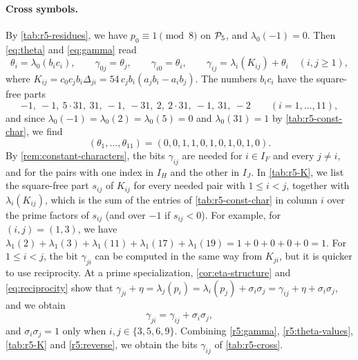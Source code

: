 \paragraph{Cross symbols.} By \cref{tab:r5-residues}, we have $p_0\equiv1\pmod8$ on $\mathcal P_5$, and $\lambda_0(-1)=0$. Then \eqref{eq:theta} and \eqref{eq:gamma} read
\begin{equation}\label{r5:gamma}
\theta_i=\lambda_0(b_ic_i),\qquad \gamma_{0j}=\theta_j,\qquad \gamma_{i0}=\theta_i,\qquad \gamma_{ij}=\lambda_i(K_{ij})+\theta_i\quad(i,j\ge1),
\end{equation}
where $K_{ij}=c_0c_jb_i\Delta_{ji}=54\,c_jb_i(a_jb_i-a_ib_j)$. The numbers $b_ic_i$ have the square-free parts
\[
-1,\ -1,\ 5\cdot31,\ 31,\ -1,\ -31,\ 2,\ 2\cdot31,\ -1,\ 31,\ -2\qquad(i=1,\dots,11),
\]
and since $\lambda_0(-1)=\lambda_0(2)=\lambda_0(5)=0$ and $\lambda_0(31)=1$ by \cref{tab:r5-const-char}, we find
\begin{equation}\label{r5:theta-values}
(\theta_1,\dots,\theta_{11})=(0,0,1,1,0,1,0,1,0,1,0).
\end{equation}
By \cref{rem:constant-characters}, the bits $\gamma_{ij}$ are needed for $i\in I_F$ and every $j\ne i$, and for the pairs with one index in $I_H$ and the other in $I_J$. In \cref{tab:r5-K}, we list the square-free part $s_{ij}$ of $K_{ij}$ for every needed pair with $1\le i<j$, together with $\lambda_i(K_{ij})$, which is the sum of the entries of \cref{tab:r5-const-char} in column $i$ over the prime factors of $s_{ij}$ (and over $-1$ if $s_{ij}<0$). For example, for $(i,j)=(1,3)$, we have $\lambda_1(2)+\lambda_1(3)+\lambda_1(11)+\lambda_1(17)+\lambda_1(19)=1+0+0+0+0=1$. For $1\le i<j$, the bit $\gamma_{ji}$ can be computed in the same way from $K_{ji}$, but it is quicker to use reciprocity. At a prime specialization, \cref{cor:eta-structure} and \eqref{eq:reciprocity} show that $\gamma_{ji}+\eta=\lambda_j(p_i)=\lambda_i(p_j)+\sigma_i\sigma_j=\gamma_{ij}+\eta+\sigma_i\sigma_j$, and we obtain
\begin{equation}\label{r5:reverse}
\gamma_{ji}=\gamma_{ij}+\sigma_i\sigma_j,
\end{equation}
and $\sigma_i\sigma_j=1$ only when $i,j\in\{3,5,6,9\}$. Combining \eqref{r5:gamma}, \eqref{r5:theta-values}, \cref{tab:r5-K} and \eqref{r5:reverse}, we obtain the bits $\gamma_{ij}$ of \cref{tab:r5-cross}.

